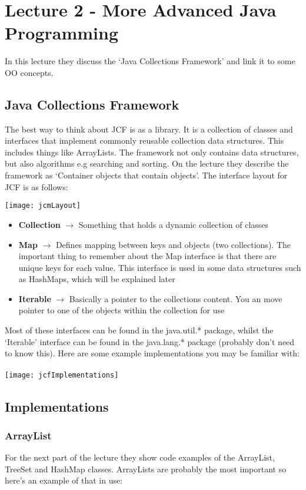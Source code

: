 \documentclass{article}
\begin{document}
\section{Lecture 2 - More Advanced Java Programming}

In this lecture they discuss the `Java Collections Framework' and link it to some OO concepts.

\subsection{Java Collections Framework}

The best way to think about JCF is as a library. It is a collection of classes and interfaces that implement commonly reusable collection data structures. This includes things like ArrayLists. The framework not only contains data structures, but also algorithms e.g searching and sorting. On the lecture they describe the framework as `Container objects that contain objects'. The interface layout for JCF is as follows:

\texttt{[image: jcmLayout]}

\begin{itemize}
    \item \textbf{Collection} $\longrightarrow$ Something that holds a dynamic collection of classes
    \item \textbf{Map} $\longrightarrow$ Defines mapping between keys and objects (two collections). The important thing to remember about the Map interface is that there are unique keys for each value. This interface is used in some data structures such as HashMaps, which will be explained later
    \item \textbf{Iterable} $\longrightarrow$ Basically a pointer to the collections content. You an move pointer to one of the objects within the collection for use
\end{itemize}

Most of these interfaces can be found in the java.util.* package, whilst the `Iterable' interface can be found in the java.lang.* package (probably don't need to know this). Here are some example implementations you may be familiar with:
\\\\
\texttt{[image: jcfImplementations]}
\newpage
\subsection{Implementations}
\subsubsection{ArrayList}
For the next part of the lecture they show code examples of the ArrayList, TreeSet and HashMap classes. ArrayLists are probably the most important so here's an example of that in use:
\end{document}
